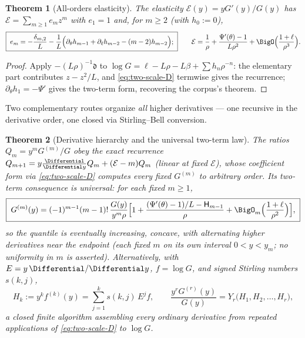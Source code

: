 \documentclass[11pt,oneside]{article}
\numberwithin{equation}{section}
\newtheorem{theorem}{Theorem}[section]
\theoremstyle{definition}
\theoremstyle{remark}
\newcommand{\Bell}{Y}
\newcommand{\Hnum}{\mathsf H}
\begin{document}
\begin{theorem}[All-orders elasticity]
\label{thm:elasticity}
The elasticity
$\mathcal E(y)=yG'(y)/G(y)$ has
$\mathcal E=\sum_{m\ge1}e_mz^{m}$ with $e_1=1$ and, for $m\ge2$
(with $h_0:=0$),
\begin{equation}
 \boxed{\;
 e_m=-\frac{\delta_{m,2}}{L}
 -\frac1L\Bigl(
 \partial_\theta h_{m-1}
 +\partial_\ell h_{m-2}-(m-2)h_{m-2}
 \Bigr);
 \;}
 \qquad
 \mathcal E
 =\frac1\rho+\frac{\Psi'(\theta)-1}{L\rho^{2}}
 +\BigO\Bigl(\frac{1+\ell}{\rho^{3}}\Bigr).
 \label{eq:elasticity}
\end{equation}
\end{theorem}

\begin{proof}
Apply $-(L\rho)^{-1}\mathfrak d$ to
$\log G=\ell-L\rho-L\beta+\sum h_n\rho^{-n}$: the elementary part
contributes $z-z^{2}/L$, and \eqref{eq:two-scale-D} termwise gives
the recurrence; $\partial_\theta h_1=-\Psi'$ gives the two-term
form, recovering the corpus's theorem.
\end{proof}

Two complementary routes organize \emph{all} higher derivatives ---
one recursive in the derivative order, one closed via Stirling--Bell
conversion.

\begin{theorem}[Derivative hierarchy and the universal two-term law]
\label{thm:derivative-hierarchy}
The ratios $Q_m=y^{m}G^{(m)}/G$ obey the exact recurrence
$Q_{m+1}=y\tfrac{\Differential}{\Differential y}Q_m+(\mathcal E-m)Q_m$ (linear at fixed
$\mathcal E$), whose coefficient form via
\eqref{eq:two-scale-D} computes every fixed $G^{(m)}$ to arbitrary
order.  Its two-term consequence is universal: for each fixed
$m\ge1$,
\begin{equation}
 \boxed{\;
 G^{(m)}(y)=(-1)^{m-1}(m-1)!\,
 \frac{G(y)}{y^{m}\rho}
 \Bigl[1+\frac{(\Psi'(\theta)-1)/L-\Hnum_{m-1}}{\rho}
 +\BigO_m\Bigl(\frac{1+\ell}{\rho^{2}}\Bigr)\Bigr],
 \;}
 \label{eq:two-term-derivative}
\end{equation}
so the quantile is eventually increasing, concave, with alternating
higher derivatives near the endpoint (each fixed $m$ on its own
interval $0<y<y_m$; no uniformity in $m$ is asserted).
Alternatively, with $E=y\,\Differential/\Differential y$, $f=\log G$, and signed
Stirling numbers $s(k,j)$,
\begin{equation}
 H_k:=y^{k}f^{(k)}(y)=\sum_{j=1}^{k}s(k,j)\,E^{j}f,
 \qquad
 \frac{y^{r}G^{(r)}(y)}{G(y)}
 =\Bell_r\bigl(H_1,H_2,\dots,H_r\bigr),
 \label{eq:stirling-bell}
\end{equation}
a closed finite algorithm assembling every ordinary derivative from
repeated applications of \eqref{eq:two-scale-D} to $\log G$.
\end{theorem}
\end{document}
